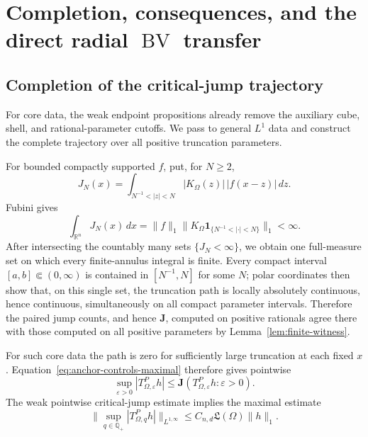 \documentclass[11pt]{article}
\numberwithin{equation}{section}
\theoremstyle{remark}
\theoremstyle{definition}
\newcommand{\R}{\mathbb R}
\newcommand{\norm}[1]{\lVert #1\rVert}
\newcommand{\BV}{\operatorname{BV}}
\begin{document}
\section{Completion, consequences, and the direct radial
\texorpdfstring{$\BV$}{BV} transfer}\label{sec:limits}

\subsection{Completion of the critical-jump trajectory}

For core data, the weak endpoint propositions already remove the
auxiliary cube, shell, and rational-parameter cutoffs.  We pass to
general $L^1$ data and construct the complete trajectory over all positive
truncation parameters.

For bounded compactly supported $f$, put, for $N\ge2$,
\[
 J_N(x)=\int_{N^{-1}<|z|<N}|K_\Omega(z)|\,|f(x-z)|\,dz.
\]
Fubini gives
\[
 \int_{\R^n}J_N(x)\,dx
 =\norm f_1
  \norm{K_\Omega\mathbf1_{\{N^{-1}<|\cdot|<N\}}}_1<\infty.
\]
After intersecting the countably many sets $\{J_N<\infty\}$, we obtain
one full-measure set on which every finite-annulus integral is finite.
Every compact interval $[a,b]\Subset(0,\infty)$ is contained in
$[N^{-1},N]$ for some $N$; polar coordinates then show that, on this
single set, the truncation path is locally absolutely continuous, hence
continuous, simultaneously on all compact parameter intervals.  Therefore
the paired jump counts, and hence $\mathbf J$, computed on positive
rationals agree there with those computed on all positive parameters by
Lemma~\ref{lem:finite-witness}.

For such core data the path is zero for sufficiently large truncation at
each fixed $x$.  Equation~\eqref{eq:anchor-controls-maximal} therefore
gives pointwise
\[
 \sup_{\varepsilon>0}|T^P_{\Omega,\varepsilon}h|
 \le\mathbf J(T^P_{\Omega,\varepsilon}h:\varepsilon>0).
\]
The weak pointwise critical-jump estimate implies the maximal estimate
\begin{equation}\label{eq:maximalfromjump}
 \norm{\sup_{q\in\mathbb Q_+}|T^P_{\Omega,q}h|}_{L^{1,\infty}}
 \le C_{n,d}\mathfrak L(\Omega)\norm h_1.
\end{equation}
\end{document}
